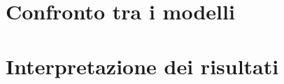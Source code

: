 \label{chap:valutazioni}

%

\section{Confronto tra i modelli}
\section{Interpretazione dei risultati}


